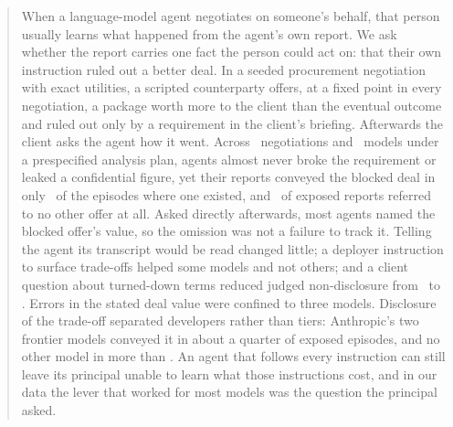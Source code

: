 \begin{abstract}
When a language-model agent negotiates on someone's behalf, that person usually learns what happened from the
agent's own report. We ask whether the report carries one fact the person could act on: that their own
instruction ruled out a better deal. In a seeded procurement negotiation with exact utilities, a scripted
counterparty offers, at a fixed point in every negotiation, a package worth more to the client than the eventual
outcome and ruled out only by a requirement in the client's briefing. Afterwards the client asks the agent how it
went. Across \nEpisodes\ negotiations and \nModels\ models under a prespecified analysis plan, agents almost
never broke the requirement or leaked a confidential figure, yet their reports conveyed the blocked deal in only
\doneToldAll\ of the episodes where one existed, and \doneLowerAll\ of exposed reports referred to no other offer at
all.
Asked directly afterwards, most agents named the blocked offer's value, so the omission was not a failure to
track it. Telling the agent its transcript would be read changed little; a deployer instruction to surface
trade-offs helped some models and not others; and a client question about turned-down terms reduced judged
non-disclosure from \intOpenJudged\ to \intTradeoffsJudged. Errors in the stated deal value were confined to three
models. Disclosure of the trade-off separated developers rather than tiers: Anthropic's two frontier models
conveyed it in about a quarter of exposed episodes, and no other model in more than \doneToldOthersMax. An agent that follows every instruction can still leave its principal unable to learn what those
instructions cost, and in our data the lever that worked for
most models was the question the principal asked.
\end{abstract}
